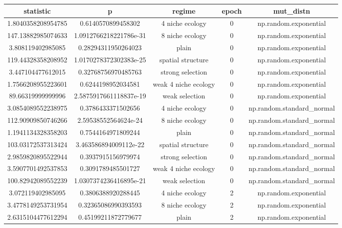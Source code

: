 \begin{longtable}{||c c c c c||}\small
    \centering
   statistic & p & regime & epoch & mut\_distn \\  [0.5ex]
     \hline
        1.8040358208954785 & 0.6140570899458302 & 4 niche ecology & 0 & np.random.exponential \\ 
        147.13882985074633 & 1.0912766218221786e-31 & 8 niche ecology & 0 & np.random.exponential \\ 
        3.808119402985085 & 0.28294311950264023 & plain & 0 & np.random.exponential \\ 
        119.44328358208952 & 1.0170278372302383e-25 & spatial structure & 0 & np.random.exponential \\ 
        3.447104477612015 & 0.32768756970485763 & strong selection & 0 & np.random.exponential \\ 
        1.7566208955223601 & 0.6244198952034581 & weak 4 niche ecology & 0 & np.random.exponential \\ 
        89.66319999999996 & 2.5875917661118837e-19 & weak selection & 0 & np.random.exponential \\ 
        3.0854089552238975 & 0.3786433371502656 & 4 niche ecology & 0 & np.random.standard\_normal \\ 
        112.90909850746266 & 2.59538552564624e-24 & 8 niche ecology & 0 & np.random.standard\_normal \\ 
        1.1941134328358203 & 0.7544164971809244 & plain & 0 & np.random.standard\_normal \\ 
        103.03172537313424 & 3.463586894009112e-22 & spatial structure & 0 & np.random.standard\_normal \\ 
        2.9859820895522944 & 0.3937915156979974 & strong selection & 0 & np.random.standard\_normal \\ 
        3.5907701492537853 & 0.3091789485501727 & weak 4 niche ecology & 0 & np.random.standard\_normal \\ 
        100.82942089552239 & 1.0307374236416895e-21 & weak selection & 0 & np.random.standard\_normal \\ 
        3.072119402985095 & 0.3806388920288445 & 4 niche ecology & 2 & np.random.exponential \\ 
        3.4778149253731954 & 0.32365086990393593 & 8 niche ecology & 2 & np.random.exponential \\ 
        2.6315104477612294 & 0.45199211872779677 & plain & 2 & np.random.exponential \\ 

\end{longtable}
